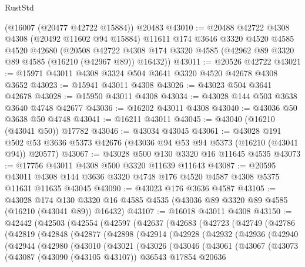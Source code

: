 \begin{lexlean}{RustStd}
\begin{coremodule}
    (@16007 (@20477 @42722 @15884))
    @20483
@43010 := @20488
    @42722
    @4308
    @4308
    (@20492 @11602 @94 @15884)
    @11611
    @174
    @3646
    @3320
    @4520
    @4585
    @4520
    @42680
    (@20508 @42722 @4308 @174 @3320 @4585 (@42962 @89 @3320 @89 @4585 (@16210 (@42967 @89)) @16432))
@43011 := @20526 @42722
@43021 := @15971 @43011 @4308 @3324 @504 @3641 @3320 @4520 @42678 @4308 @3652
@43023 := @15941 @43011 @4308
@43026 := @43023 @504 @3641 @42678
@43028 := @15950 @43011 @4308
@43034 := @43028 @144 @503 @3638 @3640 @4748 @42677
@43036 := @16202 @43011 @4308
@43040 := @43036 @50 @3638 @50 @4748
@43041 := @16211 @43011
@43045 := @43040 (@16210 (@43041 @50)) @17782
@43046 := @43034 @43045
@43061 := @43028
    @191
    @502
    @53
    @3636
    @5373
    @42676
    (@43036 @94 @53 @94 @5373 (@16210 (@43041 @94)) @20577)
@43067 := @43028 @500 @130 @3320 @16 @11645 @4535
@43073 := @17756 @43011 @4308 @500 @3320 @11639 @11643
@43087 := @20595
    @43011
    @4308
    @144
    @3636
    @3320
    @4748
    @176
    @4520
    @4587
    @4308
    @5375
    @11631
    @11635
    @43045
@43090 := @43023 @176 @3636 @4587
@43105 := @43028
    @174
    @130
    @3320
    @16
    @4585
    @4535
    (@43036 @89 @3320 @89 @4585 (@16210 (@43041 @89)) @16432)
@43107 := @16018 @43011 @4308
@43150 := @42442
    (@42503
      (@42554
        (@42597
          (@42637
            (@42683
              (@42723
                (@42749
                  (@42786
                    (@42819
                      (@42848
                        (@42877
                          (@42898
                            (@42914
                              (@42928
                                (@42932
                                  (@42936
                                    (@42940
                                      (@42944
                                        (@42980
                                          (@43010
                                            (@43021
                                              (@43026
                                                (@43046
                                                  (@43061
                                                    (@43067
                                                      (@43073
                                                        (@43087
                                                          (@43090 (@43105 @43107))
                                                          @36543
                                                          @17854
                                                          @20636

\end{coremodule}
\end{lexlean}
